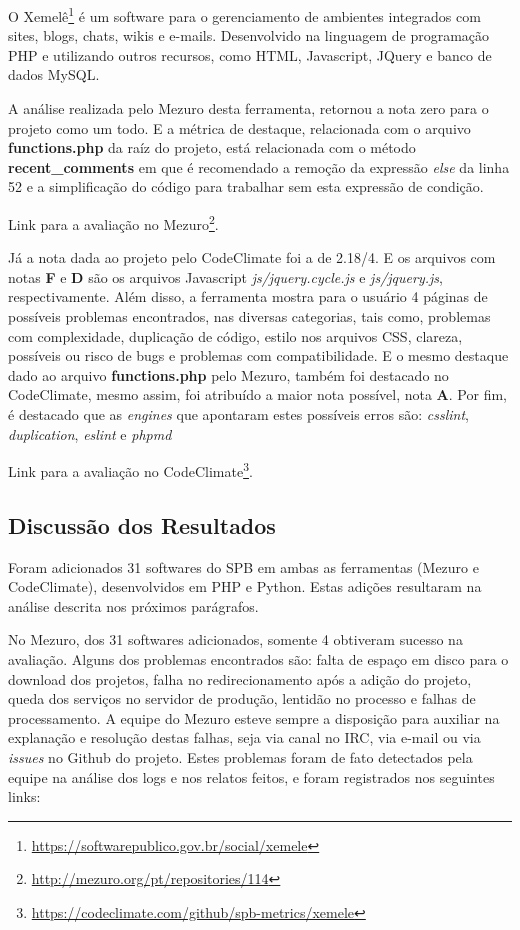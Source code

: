 
O Xemelê\footnote{\url{https://softwarepublico.gov.br/social/xemele}} é um
software para o gerenciamento de ambientes integrados com sites, blogs, chats,
wikis e e-mails. Desenvolvido na linguagem de programação PHP e utilizando outros
recursos, como HTML, Javascript, JQuery e banco de dados MySQL.

A análise realizada pelo Mezuro desta ferramenta, retornou a nota zero para o
projeto como um todo. E a métrica de destaque, relacionada com o arquivo
\textbf{functions.php} da raíz do projeto, está relacionada com o método
\textbf{recent\_comments} em que é recomendado a remoção da expressão
\textit{else} da linha 52 e a simplificação do código para trabalhar sem esta
expressão de condição.

Link para a avaliação no Mezuro\footnote{\url{http://mezuro.org/pt/repositories/114}}.

Já a nota dada ao projeto pelo CodeClimate foi a de 2.18/4. E os arquivos com
notas \textbf{F} e \textbf{D} são os arquivos Javascript \textit{js/jquery.cycle.js}
e \textit{js/jquery.js}, respectivamente. Além disso, a ferramenta mostra para o
usuário 4 páginas de possíveis problemas encontrados, nas diversas categorias,
tais como, problemas com complexidade, duplicação de código, estilo nos arquivos
CSS, clareza, possíveis ou risco de bugs e problemas com compatibilidade. E o
mesmo destaque dado ao arquivo \textbf{functions.php} pelo Mezuro, também foi
destacado no CodeClimate, mesmo assim, foi atribuído a maior nota possível, nota
\textbf{A}. Por fim, é destacado que as \textit{engines} que apontaram estes possíveis
erros são: \textit{csslint}, \textit{duplication}, \textit{eslint} e
\textit{phpmd}

Link para a avaliação no CodeClimate\footnote{\url{https://codeclimate.com/github/spb-metrics/xemele}}.

\subsection{Discussão dos Resultados}

Foram adicionados 31 softwares do SPB em ambas as ferramentas (Mezuro e
CodeClimate), desenvolvidos em PHP e Python. Estas adições resultaram na
análise descrita nos próximos parágrafos.

No Mezuro, dos 31 softwares adicionados, somente 4 obtiveram sucesso na
avaliação. Alguns dos problemas encontrados são: falta de espaço em disco para
o download dos projetos, falha no redirecionamento após a adição do projeto,
queda dos serviços no servidor de produção, lentidão no processo e falhas de
processamento. A equipe do Mezuro esteve sempre a disposição para auxiliar na
explanação e resolução destas falhas, seja via canal no IRC, via e-mail ou via
\textit{issues} no Github do projeto. Estes problemas foram de fato detectados
pela equipe na análise dos logs e nos relatos feitos, e foram registrados nos
seguintes links:

